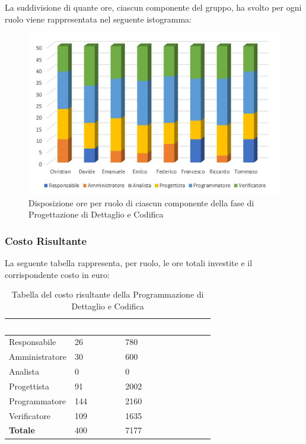 La suddivisione di quante ore, ciascun componente del gruppo, ha svolto per ogni ruolo viene rappresentata nel seguente istogramma:
\begin{figure}[h!]
\centering
\includegraphics[scale=2.5]{Sezioni/Istogrammi/IstogrammaDiDettaglio.png}
\caption{Disposizione ore per ruolo di ciascun componente della fase di Progettazione di Dettaglio e Codifica}
\end{figure}

\clearpage

\subsubsection{Costo Risultante}
La seguente tabella rappresenta, per ruolo, le ore totali investite e il corrispondente costo in euro:
{
\renewcommand{\arraystretch}{2}
\begin{longtable}{ C{3cm} C{2cm} C{4cm}}
\caption{Tabella del costo risultante della Programmazione di Dettaglio e Codifica}\\

\textcolor{white}{\textbf{Ruolo}} & 
\textcolor{white}{\textbf{Totale ore}} & 
\textcolor{white}{\textbf{Costo ruolo in euro}}\\	
\endhead
        
Responsabile    &  26 &  780 \\
Amministratore  &  30 &  600 \\
Analista        &   0 &    0 \\
Progettista     &  91 & 2002 \\
Programmatore   & 144 & 2160 \\
Verificatore    & 109 & 1635 \\
\textbf{Totale} & 400 & 7177 \\
		
\end{longtable}
}


